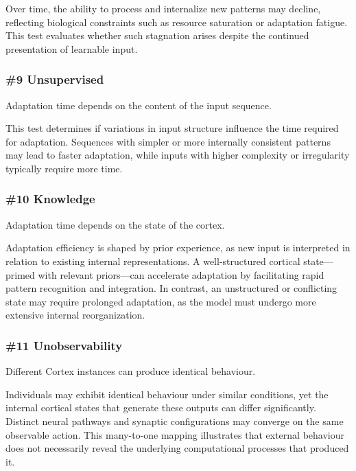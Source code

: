 \documentclass{article}
\newenvironment{one_assertion}[1]
{
	\begin{tabular}{p{1.5cm}p{8.2cm}}
		\textbf{Assertion:} & #1 \\
	}{
	\end{tabular}\\
}
\begin{document}
	Over time, the ability to process and internalize new patterns may decline, reflecting biological constraints such as resource saturation or adaptation fatigue. This test evaluates whether such stagnation arises despite the continued presentation of learnable input.
	
	\subsubsection*{\#9 Unsupervised}
	\begin{one_assertion}
		{Adaptation time depends on the content of the input sequence.}
	\end{one_assertion}
	
	This test determines if variations in input structure influence the time required for adaptation. Sequences with simpler or more internally consistent patterns may lead to faster adaptation, while inputs with higher complexity or irregularity typically require more time. 
	
	\subsubsection*{\#10 Knowledge}
	\begin{one_assertion}
		{Adaptation time depends on the state of the cortex.}
	\end{one_assertion}
	
	Adaptation efficiency is shaped by prior experience, as new input is interpreted in relation to existing internal representations. A well-structured cortical state—primed with relevant priors—can accelerate adaptation by facilitating rapid pattern recognition and integration. In contrast, an unstructured or conflicting state may require prolonged adaptation, as the model must undergo more extensive internal reorganization.
	
	\subsubsection*{\#11 Unobservability}
	\begin{one_assertion}
		{Different Cortex instances can produce identical behaviour.}
	\end{one_assertion}
	
	Individuals may exhibit identical behaviour under similar conditions, yet the internal cortical states that generate these outputs can differ significantly. Distinct neural pathways and synaptic configurations may converge on the same observable action. This many-to-one mapping illustrates that external behaviour does not necessarily reveal the underlying computational processes that produced it.
	
\end{document}
